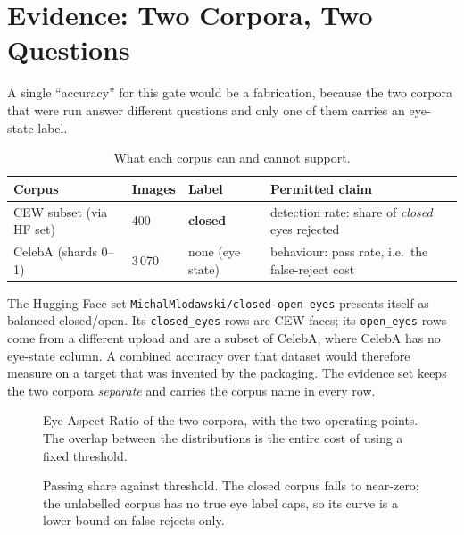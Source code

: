 \documentclass[11pt,a4paper]{article}
\newcommand{\coden}[1]{\texttt{\small #1}}
\begin{document}
\section{Evidence: Two Corpora, Two Questions}
\label{sec:evidence}

A single ``accuracy'' for this gate would be a fabrication, because the
two corpora that were run answer different questions and only one of
them carries an eye-state label.

\begin{table}[H]
\centering
\caption{What each corpus can and cannot support.}
\label{tab:corpora}
\renewcommand{\arraystretch}{1.3}
\begin{tabularx}{\linewidth}{@{}l l l X@{}}
\toprule
\textbf{Corpus} & \textbf{Images} & \textbf{Label} & \textbf{Permitted claim} \\
\midrule
CEW subset (via HF set) & 400 & \textbf{closed} & detection rate: share of \emph{closed} eyes rejected \\
CelebA (shards 0--1)    & 3\,070 & none (eye state) & behaviour: pass rate, i.e.\ the false-reject cost \\
\bottomrule
\end{tabularx}
\end{table}

The Hugging-Face set \coden{MichalMlodawski/closed-open-eyes} presents
itself as balanced closed/open. Its \coden{closed\_eyes} rows are CEW
faces; its \coden{open\_eyes} rows come from a different upload and are
a subset of CelebA, where CelebA has no eye-state column. A combined
accuracy over that dataset would therefore measure on a target that was
invented by the packaging. The evidence set keeps the two corpora
\emph{separate} and carries the corpus name in every row.

\begin{figure}[H]
  \centering
  \caption{Eye Aspect Ratio of the two corpora, with the two operating
  points. The overlap between the distributions is the entire cost of
  using a fixed threshold.}
  \label{fig:ear-hist}
\end{figure}

\begin{figure}[H]
  \centering
  \caption{Passing share against threshold. The closed corpus falls to
  near-zero; the unlabelled corpus has no true eye label caps, so its curve
  is a lower bound on false rejects only.}
  \label{fig:pass-thr}
\end{figure}
\end{document}
